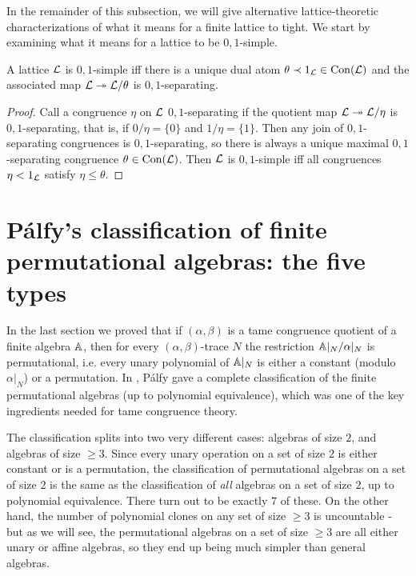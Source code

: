 \begin{appendices}
In the remainder of this subsection, we will give alternative lattice-theoretic characterizations of what it means for a finite lattice to tight. We start by examining what it means for a lattice to be $0,1$-simple.

\begin{prop} A lattice $\mathcal{L}$ is $0,1$-simple iff there is a unique dual atom $\theta \prec 1_{\mathcal{L}} \in \operatorname{Con}(\mathcal{L})$ and the associated map $\mathcal{L} \twoheadrightarrow \mathcal{L}/\theta$ is $0,1$-separating.
\end{prop}
\begin{proof} Call a congruence $\eta$ on $\mathcal{L}$ $0,1$-separating if the quotient map $\mathcal{L} \twoheadrightarrow \mathcal{L}/\eta$ is $0,1$-separating, that is, if $0/\eta = \{0\}$ and $1/\eta = \{1\}$. Then any join of $0,1$-separating congruences is $0,1$-separating, so there is always a unique maximal $0,1$-separating congruence $\theta \in \operatorname{Con}(\mathcal{L})$. Then $\mathcal{L}$ is $0,1$-simple iff all congruences $\eta < 1_{\mathcal{L}}$ satisfy $\eta \le \theta$.
\end{proof}



\section{P\'alfy's classification of finite permutational algebras: the five types}

In the last section we proved that if $(\alpha,\beta)$ is a tame congruence quotient of a finite algebra $\mathbb{A}$, then for every $(\alpha,\beta)$-trace $N$ the restriction $\mathbb{A}|_N / \alpha|_N$ is permutational, i.e. every unary polynomial of $\mathbb{A}|_N$ is either a constant (modulo $\alpha|_N$) or a permutation. In \cite{palfy-permutational}, P\'alfy gave a complete classification of the finite permutational algebras (up to polynomial equivalence), which was one of the key ingredients needed for tame congruence theory.

The classification splits into two very different cases: algebras of size $2$, and algebras of size $\ge 3$. Since every unary operation on a set of size $2$ is either constant or is a permutation, the classification of permutational algebras on a set of size $2$ is the same as the classification of \emph{all} algebras on a set of size $2$, up to polynomial equivalence. There turn out to be exactly $7$ of these. On the other hand, the number of polynomial clones on any set of size $\ge 3$ is uncountable \cite{uncountable-polynomial-clones} - but as we will see, the permutational algebras on a set of size $\ge 3$ are all either unary or affine algebras, so they end up being much simpler than general algebras.


\end{appendices}

